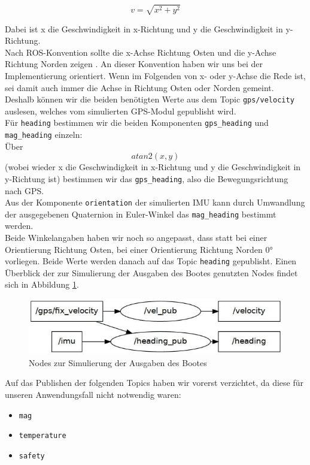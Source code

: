 \documentclass[11pt]{article}
\begin{document}
\begin{equation}
v = \sqrt{x^2+y^2}
\end{equation}

Dabei ist x die Geschwindigkeit in x-Richtung und y die Geschwindigkeit in y-Richtung.\\
Nach ROS-Konvention sollte die x-Achse Richtung Osten und die y-Achse Richtung Norden zeigen \cite{REP105}. An dieser Konvention haben wir uns bei der Implementierung orientiert. Wenn im Folgenden von x- oder y-Achse die Rede ist, sei damit auch immer die Achse in Richtung Osten oder Norden gemeint.\\
Deshalb können wir die beiden benötigten Werte aus dem Topic \texttt{gps/velocity} auslesen, welches vom simulierten GPS-Modul gepublisht wird.\\
Für \texttt{heading} bestimmen wir die beiden Komponenten \texttt{gps\_heading} und \texttt{mag\_heading} einzeln:\\
Über 
\begin{equation}
	atan2(x,y) 	
\end{equation}
(wobei wieder x die Geschwindigkeit in x-Richtung und y die Geschwindigkeit in y-Richtung ist) bestimmen wir das \texttt{gps\_heading}, also die Bewegungsrichtung nach GPS. \\
Aus der Komponente \texttt{orientation} der simulierten IMU kann durch Umwandlung der ausgegebenen Quaternion in Euler-Winkel das \texttt{mag\_heading} bestimmt werden.\\
Beide Winkelangaben haben wir noch so angepasst, dass statt bei einer Orientierung Richtung Osten, bei einer Orientierung Richtung Norden 0° vorliegen. Beide Werte werden danach auf das Topic \texttt{heading} gepublisht. Einen Überblick der zur Simulierung der Ausgaben des Bootes genutzten Nodes findet sich in Abbildung \ref{output-sim-nodes}.

\begin{figure}
	\centering
	\includegraphics[width=0.7\linewidth]{simulation-nodes}
	\caption{Nodes zur Simulierung der Ausgaben des Bootes}
	\label{output-sim-nodes}
\end{figure}

Auf das Publishen der folgenden Topics haben wir vorerst verzichtet, da diese für unseren Anwendungsfall nicht notwendig waren:
\begin{itemize}
	\item \texttt{mag}
	\item \texttt{temperature}
	\item \texttt{safety}
\end{itemize}
\end{document}
